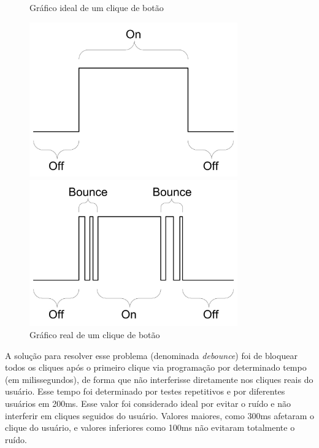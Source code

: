 \begin{figure}[htb]
	\centering
 	\begin{minipage}{0.45\textwidth}
		\centering
		\caption{\label{fig:debounce-graph-1}Gráfico ideal de um clique de botão}
		\includegraphics[width=0.8\textwidth]{img/debounce-graph-1.jpg}
	\end{minipage}
	\hfill
	\begin{minipage}{0.45\textwidth}
		\centering
		\caption{\label{fig:debounce-graph-2}Gráfico real de um clique de botão}
		\includegraphics[width=0.8\textwidth]{img/debounce-graph-2.jpg}
	\end{minipage}
\end{figure}

A solução para resolver esse problema (denominada \textit{debounce}) foi de bloquear todos os cliques após o primeiro clique via programação por determinado tempo (em milissegundos), de forma que não interferisse diretamente nos cliques reais do usuário. Esse tempo foi determinado por testes repetitivos e por diferentes usuários em 200ms. Esse valor foi considerado ideal por evitar o ruído e não interferir em cliques seguidos do usuário. Valores maiores, como 300ms afetaram o clique do usuário, e valores inferiores como 100ms não evitaram totalmente o ruído.

